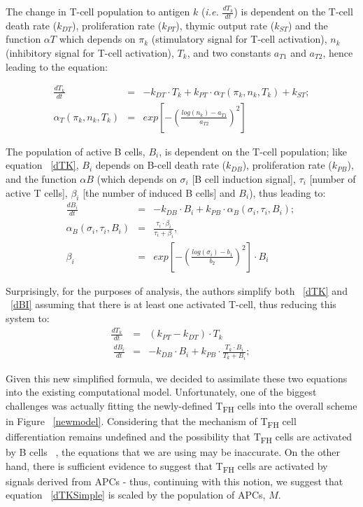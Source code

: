 \documentclass[a4paper, 12pt]{report}
\begin{document}
The change in T-cell population to antigen $k$ (\emph{i.e.} $\frac{dT_k}{dt}$) is dependent on the T-cell death rate ($k_{DT}$), proliferation rate ($k_{PT}$), thymic output rate ($k_{ST}$) and the function $\alpha{T}$ which depends on $\pi_{k}$ (stimulatory signal for T-cell activation), $n_{k}$ (inhibitory signal for T-cell activation), $T_{k}$, and two constants $a_{T1}$ and $a_{T2}$, hence leading to the equation:

\begin{eqnarray}
\frac{dT_k}{dt} &=& -k_{DT} \cdot T_k + k_{PT} \cdot \alpha_{T}(\pi_{k}, n_{k}, T_{k}) + k_{ST}; \label{dTK} \\
\alpha_{T}(\pi_{k}, n_{k}, T_{k}) &=& exp\left[-\left(\frac{log(n_{k}) - a_{T1}}{a_{T2}}\right)^{2}\right]
\end{eqnarray}

The population of active B cells, $B_{i}$, is dependent on the T-cell population; like equation ~\ref{dTK}, $B_{i}$ depends on B-cell death rate ($k_{DB}$), proliferation rate ($k_{PB}$), and the function $\alpha{B}$ (which depends on $\sigma_{i}$ [B cell induction signal], $\tau_{i}$ [number of active T cells], $\beta_{i}$ [the number of induced B cells] and $B_{i}$), thus leading to:
\begin{eqnarray}
\frac{dB_i}{dt} &=& -k_{DB} \cdot B_i + k_{PB} \cdot \alpha_{B}(\sigma_{i}, \tau_{i}, B_{i}); ~\label{dBI} \\
\alpha_{B}(\sigma_{i}, \tau_{i}, B_{i}) &=& \frac{\tau_{i}\cdot{\beta_{i}}}{\tau_{i} + \beta_{i}}, \\
\beta_{i} &=&  exp\left[-\left(\frac{log(\sigma_{i}) - b_{1}}{b_{2}}\right)^{2}\right] \cdot B_{i}
\end{eqnarray}

Surprisingly, for the purposes of analysis, the authors simplify both ~\ref{dTK} and ~\ref{dBI} assuming that there is at least one activated T-cell, thus reducing this system to:
\begin{eqnarray}
\frac{dT_k}{dt} &=& (k_{PT}-k_{DT}) \cdot T_k \\ ~\label{dTKSimple}
\frac{dB_i}{dt} &=& -k_{DB} \cdot B_i + k_{PB} \cdot \frac{T_{k} \cdot B_{i}}{T_{k}+B_{i}}; ~\label{dBISimple}
\end{eqnarray}

Given this new simplified formula, we decided to assimilate these two equations into the existing computational model. Unfortunately, one of the biggest challenges was actually fitting the newly-defined T\textsubscript{FH} cells into the overall scheme in Figure ~\ref{newmodel}. Considering that the mechanism of T\textsubscript{FH} cell differentiation remains undefined and the possibility that T\textsubscript{FH} cells are activated by B cells ~\cite{Crotty}, the equations that we are using may be inaccurate. On the other hand, there is sufficient evidence to suggest that T\textsubscript{FH} cells are activated by signals derived from APCs - thus, continuing with this notion, we suggest that equation ~\ref{dTKSimple} is scaled by the population of APCs, $M$.
\end{document}
